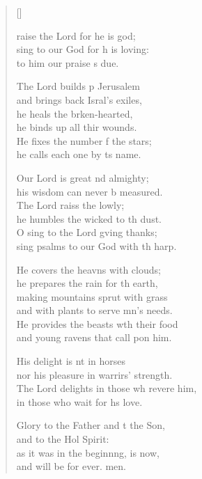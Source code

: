 \settowidth{\versewidth}{The Lord delights in those who revere him, *}
\begin{verse}[\versewidth]
  \begin{patverse}
raise the Lord for he is god;\Flex\\
sing to our God for h is loving:\Med\\
to him our praise \pointup{\i}s due.

The Lord builds p Jerusalem\Med\\
and brings back Isral’s exiles,\\
he heals the brken-hearted,\Med\\
he binds up all thir wounds.\\
He fixes the number f the stars;\Med\\
he calls each one by \pointup{\i}ts name.

Our Lord is great nd almighty;\Med\\
his wisdom can never b measured.\\
The Lord raiss the lowly;\Med\\
he humbles the wicked to th dust.\\
O sing to the Lord g\pointup{\i}ving thanks;\Med\\
sing psalms to our God with th harp.

He covers the heavns with clouds;\Med\\
he prepares the rain for th earth,\\
making mountains sprut with grass\Med\\
and with plants to serve mn’s needs.\\
He provides the beasts w\pointup{\i}th their food\Med\\
and young ravens that call pon him.

His delight is nt in horses\Med\\
nor his pleasure in warrirs’ strength.\\
The Lord delights in those wh revere him,\Med\\
in those who wait for h\pointup{\i}s love.

Glory to the Father and t the Son,\Med\\
and to the Hol Spirit:\\
as it was in the beginn\pointup{\i}ng, is now,\Med\\
and will be for ever. men.
  \end{patverse}
  \end{verse}

